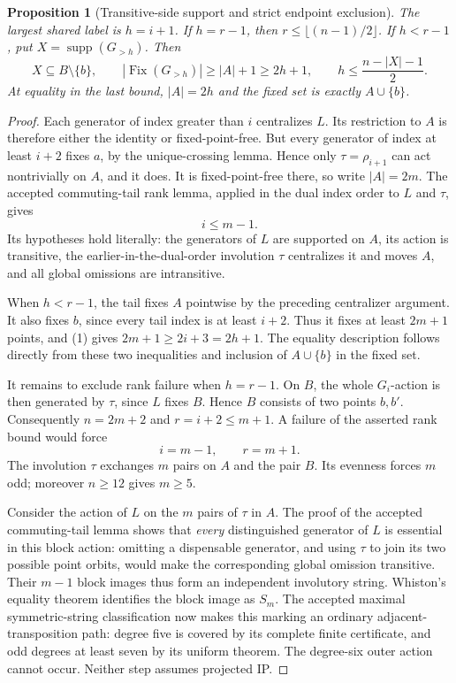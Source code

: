 \documentclass[11pt,a4paper]{article}
\newtheorem{proposition}[lemma]{Proposition}
\begin{document}
\begin{proposition}[Transitive-side support and strict endpoint exclusion]
The largest shared label is $h=i+1$. If $h=r-1$, then
$r\leq\lfloor(n-1)/2\rfloor$. If $h<r-1$, put
$X=\operatorname{supp}(G_{>h})$. Then
\[
 X\subseteq B\setminus\{b\},\qquad
 |\operatorname{Fix}(G_{>h})|\geq |A|+1\geq2h+1,
 \qquad h\leq\frac{n-|X|-1}{2}.
\]
At equality in the last bound, $|A|=2h$ and the fixed set is
exactly $A\cup\{b\}$.
\end{proposition}
\begin{proof}
Each generator of index greater than $i$ centralizes $L$.
Its restriction to $A$ is therefore either the identity or
fixed-point-free. But every generator of index at least $i+2$
fixes $a$, by the unique-crossing lemma. Hence only
$\tau=\rho_{i+1}$ can act nontrivially on $A$, and it does.
It is fixed-point-free there, so write $|A|=2m$.
The accepted commuting-tail rank lemma, applied in the dual
index order to $L$ and $\tau$, gives
\[
                              i\leq m-1.                 \tag{1}
\]
Its hypotheses hold literally: the generators of $L$ are
supported on $A$, its action is transitive, the earlier-in-the-dual-order
involution $\tau$ centralizes it and moves $A$, and all global
omissions are intransitive.

When $h<r-1$, the tail fixes $A$ pointwise by the preceding
centralizer argument. It also fixes $b$, since every tail
index is at least $i+2$. Thus it fixes at least $2m+1$
points, and (1) gives $2m+1\geq2i+3=2h+1$.
The equality description follows directly from these two
inequalities and inclusion of $A\cup\{b\}$ in the fixed set.

It remains to exclude rank failure when $h=r-1$.
On $B$, the whole $G_i$-action is then generated by $\tau$,
since $L$ fixes $B$. Hence $B$ consists of two points $b,b'$.
Consequently $n=2m+2$ and $r=i+2\leq m+1$.
A failure of the asserted rank bound would force
\[
                        i=m-1,\qquad r=m+1.              \tag{2}
\]
The involution $\tau$ exchanges $m$ pairs on $A$ and the
pair $B$. Its evenness forces $m$ odd; moreover $n\geq12$
gives $m\geq5$.

Consider the action of $L$ on the $m$ pairs of $\tau$ in $A$.
The proof of the accepted commuting-tail lemma shows that
\emph{every} distinguished generator of $L$ is essential
in this block action: omitting a dispensable generator,
and using $\tau$ to join its two possible point orbits,
would make the corresponding global omission transitive.
Their $m-1$ block images thus form an independent involutory
string. Whiston's equality theorem identifies the block
image as $S_m$. The accepted maximal symmetric-string
classification now makes this marking an ordinary adjacent-
transposition path: degree five is covered by its complete
finite certificate, and odd degrees at least seven by its
uniform theorem. The degree-six outer action cannot occur.
Neither step assumes projected IP.


\end{proof}
\end{document}
